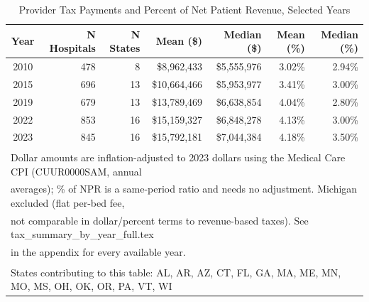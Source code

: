 \begin{table}[!h]
\centering
\caption{Provider Tax Payments and Percent of Net Patient Revenue, Selected Years}
\centering
\begin{tabular}[t]{crrrrrr}
\toprule
Year & N Hospitals & N States & Mean (\$) & Median (\$) & Mean (\%) & Median (\%)\\
\midrule
2010 & 478 & 8 & \$8,962,433 & \$5,555,976 & 3.02\% & 2.94\%\\
2015 & 696 & 13 & \$10,664,466 & \$5,953,977 & 3.41\% & 3.00\%\\
2019 & 679 & 13 & \$13,789,469 & \$6,638,854 & 4.04\% & 2.80\%\\
2022 & 853 & 16 & \$15,159,327 & \$6,848,278 & 4.13\% & 3.00\%\\
2023 & 845 & 16 & \$15,792,181 & \$7,044,384 & 4.18\% & 3.50\%\\
\bottomrule
\multicolumn{7}{l}{\textsuperscript{} Dollar amounts are inflation-adjusted to 2023 dollars using the Medical Care CPI (CUUR0000SAM, annual}\\
\multicolumn{7}{l}{averages); \% of NPR is a same-period ratio and needs no adjustment. Michigan excluded (flat per-bed fee,}\\
\multicolumn{7}{l}{not comparable in dollar/percent terms to revenue-based taxes). See tax\_summary\_by\_year\_full.tex}\\
\multicolumn{7}{l}{in the appendix for every available year.}\\
\multicolumn{7}{l}{\textsuperscript{} States contributing to this table: AL, AR, AZ, CT, FL, GA, MA, ME, MN, MO, MS, OH, OK, OR, PA, VT, WI}\\
\end{tabular}
\end{table}
